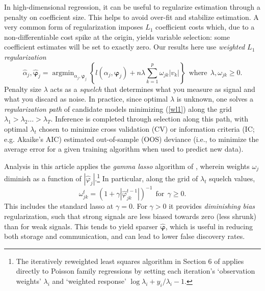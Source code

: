 \documentclass[12pt]{article}
\newcommand{\bs}[1]{\boldsymbol{#1}}
\DeclareMathOperator*{\argmin}{argmin}
\begin{document}
In high-dimensional regression, it can be useful to regularize estimation
through a penalty on coefficient size.   This helps  to avoid over-fit and
stabilize estimation.
A very common form of regularization imposes $L_1$ coefficient costs
\citep[i.e., the lasso of][]{tibshirani_regression_1996} which, due to
a non-differentiable cost spike at the origin, yields variable selection: some
coefficient estimates will be set to exactly zero.  Our results here use {\it
weighted $L_1$ regularization}
\begin{equation}\label{wl1}
 \hat\alpha_j,\bs{\hat\varphi}_j = \argmin_{\alpha_j,\bs{\varphi}_j} \left\{l(\alpha_j,\bs{\varphi}_j) + n \lambda \sum_{k=1}^p \omega_{jk} |v_k |\right\} ~~\text{where}~~\lambda,\omega_{jk} \geq 0.
\end{equation}
Penalty size $\lambda$ acts as a {\it squelch} that determines what you
measure as signal and what you discard as noise. In practice, since optimal
$\lambda$ is unknown, one solves a {\it regularization path} of candidate
models minimizing (\ref{wl1}) along the grid $\lambda_1 >
\lambda_2 \ldots > \lambda_T$.  Inference is completed through selection
along this path, with optimal $\lambda_t$ chosen to minimize cross validation
(CV) or information criteria (IC; e.g. Akaike's AIC) estimated
out-of-sample (OOS) deviance (i.e., to minimize the average error for a given
training algorithm when used to predict new data).

Analysis in this article applies the {\it gamma lasso} algorithm  of
\citet{taddy_gamma_2013}, wherein weights $\omega_j$ diminish as a
function of $|\hat\varphi_j|$.\footnote{The iteratively reweighted least
squares algorithm in Section 6 of \citet{taddy_gamma_2013} applies directly to Poisson
family regressions by setting each iteration's `observation weights' $\lambda_i$ and
`weighted response' $\log\lambda_i + y_i/\lambda_i - 1$.}  In particular,
along the grid of $\lambda_t$ squelch values,
\begin{equation}
\omega^{t}_{jk}  = \left(1 + \gamma
|\hat\varphi^{t-1}_{jk}|\right)^{-1} ~~\text{for}~~\gamma \geq 0.
\end{equation} 
This includes the standard lasso at $\gamma=0$.  For $\gamma>0$ it provides
{\it diminishing bias} regularization, such that strong signals are less
biased towards zero (less shrunk) than for weak signals. This tends to yield
sparser $\bs{\hat
\varphi}$, which is useful in reducing both storage and communication, and can
 lead to lower false discovery rates.  
\end{document}
